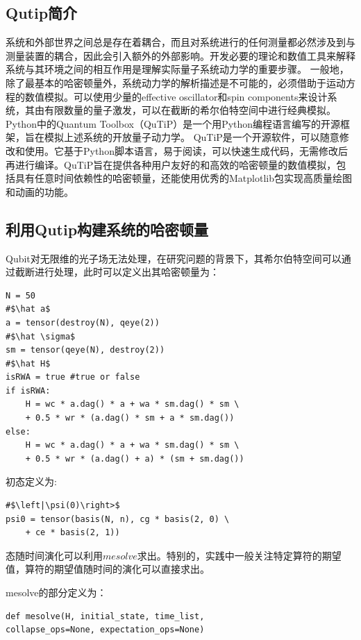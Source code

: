\documentclass{ctexart}
\begin{document}
\subsection{Qutip简介}
系统和外部世界之间总是存在着耦合，而且对系统进行的任何测量都必然涉及到与测量装置的耦合，因此会引入额外的外部影响。开发必要的理论和数值工具来解释系统与其环境之间的相互作用是理解实际量子系统动力学的重要步骤。
一般地，除了最基本的哈密顿量外，系统动力学的解析描述是不可能的，必须借助于运动方程的数值模拟。可以使用少量的effective oscillator和spin components来设计系统，其由有限数量的量子激发，可以在截断的希尔伯特空间中进行经典模拟。Python中的Quantum Toolbox（QuTiP）是一个用Python编程语言编写的开源框架\cite{johansson_qutip_2012}\cite{johansson_qutip_2013}，旨在模拟上述系统的开放量子动力学。
QuTiP是一个开源软件，可以随意修改和使用。它基于Python脚本语言，易于阅读，可以快速生成代码，无需修改后再进行编译。QuTiP旨在提供各种用户友好的和高效的哈密顿量的数值模拟，包括具有任意时间依赖性的哈密顿量，还能使用优秀的Matplotlib包实现高质量绘图和动画的功能。

\subsection{利用Qutip构建系统的哈密顿量}
Qubit对无限维的光子场无法处理，在研究问题的背景下，其希尔伯特空间可以通过截断进行处理，此时可以定义出其哈密顿量为：

\begin{verbatim}
N = 50
#$\hat a$
a = tensor(destroy(N), qeye(2))
#$\hat \sigma$
sm = tensor(qeye(N), destroy(2))
#$\hat H$
isRWA = true #true or false
if isRWA:
    H = wc * a.dag() * a + wa * sm.dag() * sm \
    + 0.5 * wr * (a.dag() * sm + a * sm.dag())
else:
    H = wc * a.dag() * a + wa * sm.dag() * sm \
    + 0.5 * wr * (a.dag() + a) * (sm + sm.dag())
\end{verbatim}

初态定义为:

\begin{verbatim}
#$\left|\psi(0)\right>$
psi0 = tensor(basis(N, n), cg * basis(2, 0) \
    + ce * basis(2, 1))
\end{verbatim}

态随时间演化可以利用$mesolve$求出。特别的，实践中一般关注特定算符的期望值，算符的期望值随时间的演化可以直接求出。

mesolve的部分定义为：
\begin{verbatim}
def mesolve(H, initial_state, time_list, 
collapse_ops=None, expectation_ops=None)
\end{verbatim}
\end{document}

